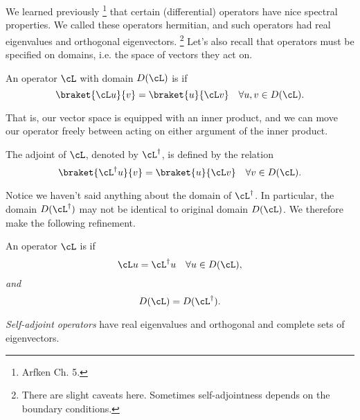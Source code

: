 We learned previously%
    \footnote{Arfken Ch. 5.}
that certain (differential) operators have nice spectral properties. We called these operators hermitian, and such operators had real eigenvalues and orthogonal eigenvectors.%
    \footnote{There are slight caveats here. Sometimes self-adjointness depends on the boundary conditions.}
Let's also recall that operators must be specified on domains, i.e. the space of vectors they act on.
\begin{defn}
    An operator $\cL$ with domain $D(\cL)$ is  if
    \begin{equation}
        \braket{\cL u}{v} = \braket{u}{\cL v} \quad \forall u,v \in D(\cL).
    \end{equation}
\end{defn}
That is, our vector space is equipped with an inner product, and we can move our operator freely between acting on either argument of the inner product.

\begin{defn}
    The adjoint of $\cL$, denoted by $\cL^\dagger$, is defined by the relation
    \begin{equation}
        \braket{\cL^\dagger u}{v} = \braket{u}{\cL v} \quad \forall v \in D(\cL).
    \end{equation}
\end{defn}
Notice we haven't said anything about the domain of $\cL^\dagger$. In particular, the domain $D(\cL^\dagger)$ may not be identical to original domain $D(\cL)$. We therefore make the following refinement.
\begin{defn}
    An operator $\cL$ is  if
    \begin{equation}
        \cL u = \cL^\dagger u \quad \forall u \in D(\cL),
    \end{equation}
    \emph{and}
    \begin{equation}
        D(\cL) = D(\cL^\dagger).
    \end{equation}
\end{defn}
\emph{Self-adjoint operators} have real eigenvalues and orthogonal and complete sets of eigenvectors.

